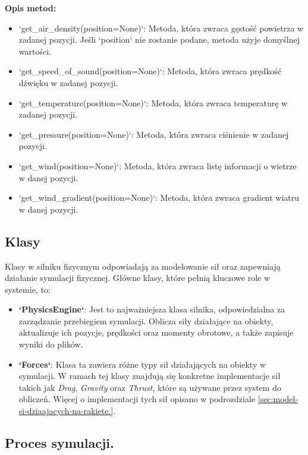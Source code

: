 \textbf{Opis metod:}
\begin{itemize}
    \item `get\_air\_density(position=None)`: Metoda, która zwraca gęstość powietrza w zadanej pozycji. Jeśli `position` nie zostanie podane, metoda użyje domyślnej wartości.
    \item `get\_speed\_of\_sound(position=None)`: Metoda, która zwraca prędkość dźwięku w zadanej pozycji.
    \item `get\_temperature(position=None)`: Metoda, która zwraca temperaturę w zadanej pozycji.
    \item `get\_pressure(position=None)`: Metoda, która zwraca ciśnienie w zadanej pozycji.
    \item `get\_wind(position=None)`: Metoda, która zwraca listę informacji o wietrze w danej pozycji.
    \item `get\_wind\_gradient(position=None)`: Metoda, która zwraca gradient wiatru w danej pozycji.
\end{itemize}


\subsection{Klasy}

Klasy w silniku fizycznym odpowiadają za modelowanie sił oraz
zapewniają
działanie symulacji fizycznej.
Główne klasy, które pełnią
kluczowe
role w
systemie, to:

\begin{itemize}
    \item \textbf{`PhysicsEngine`}: Jest to najważniejsza klasa silnika, odpowiedzialna za zarządzanie przebiegiem symulacji. Oblicza siły działające na obiekty, aktualizuje ich pozycje, prędkości oraz momenty obrotowe, a także zapisuje wyniki do plików.
    \item \textbf{`Forces`}: Klasa ta zawiera różne typy sił działających na
    obiekty w symulacji. W ramach tej klasy znajdują się konkretne
    implementacje sił takich jak \textit{Drag}, \textit{Gravity} oraz \textit{Thrust}, które są używane przez system do obliczeń. Więcej o implementacji tych sił opisano w podrozdziale \ref{sec:model-si-dziaajacych-na-rakiete.}.
\end{itemize}

\subsection{Proces symulacji.}\label{sec:proces-symulacji.}

